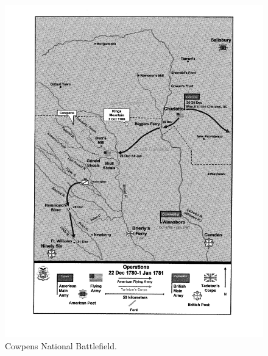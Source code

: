\begin{figure}[h]
	\singlespacing
	\begin{center}
	  \includegraphics[width=6in]{gfx/rauch_battle_2007_05_p22}
	\end{center}
	\caption{Cowpens National Battlefield.}
	\label{cowppark97}
\end{figure}
\lipsum[9]

